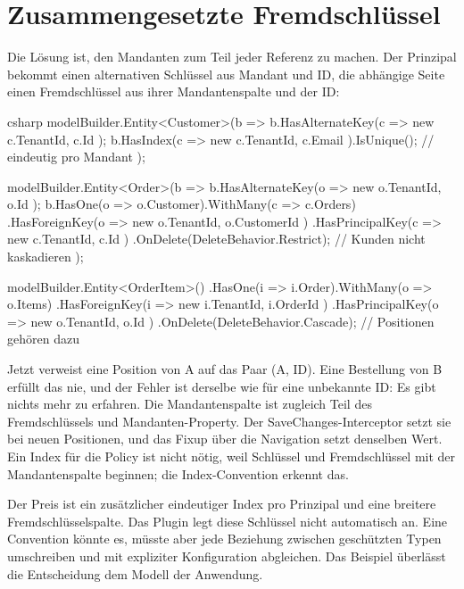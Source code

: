 \section{Zusammengesetzte Fremdschlüssel}

Die Lösung ist, den Mandanten zum Teil jeder Referenz zu machen. Der Prinzipal bekommt einen
alternativen Schlüssel aus Mandant und ID, die abhängige Seite einen Fremdschlüssel aus ihrer
Mandantenspalte und der ID:

\begin{sourcecode}{csharp}
modelBuilder.Entity<Customer>(b =>
{
    b.HasAlternateKey(c => new { c.TenantId, c.Id });
    b.HasIndex(c => new { c.TenantId, c.Email }).IsUnique();   // eindeutig pro Mandant
});

modelBuilder.Entity<Order>(b =>
{
    b.HasAlternateKey(o => new { o.TenantId, o.Id });
    b.HasOne(o => o.Customer).WithMany(c => c.Orders)
        .HasForeignKey(o => new { o.TenantId, o.CustomerId })
        .HasPrincipalKey(c => new { c.TenantId, c.Id })
        .OnDelete(DeleteBehavior.Restrict);                   // Kunden nicht kaskadieren
});

modelBuilder.Entity<OrderItem>()
    .HasOne(i => i.Order).WithMany(o => o.Items)
    .HasForeignKey(i => new { i.TenantId, i.OrderId })
    .HasPrincipalKey(o => new { o.TenantId, o.Id })
    .OnDelete(DeleteBehavior.Cascade);                         // Positionen gehören dazu
\end{sourcecode}

Jetzt verweist eine Position von A auf das Paar (A, ID). Eine Bestellung von B erfüllt das nie,
und der Fehler ist derselbe wie für eine unbekannte ID: Es gibt nichts mehr zu erfahren. Die
Mandantenspalte ist zugleich Teil des Fremdschlüssels und Mandanten-Property. Der
SaveChanges-Interceptor setzt sie bei neuen Positionen, und das Fixup über die Navigation setzt
denselben Wert. Ein Index für die Policy ist nicht nötig, weil Schlüssel und Fremdschlüssel mit
der Mandantenspalte beginnen; die Index-Convention erkennt das.

Der Preis ist ein zusätzlicher eindeutiger Index pro Prinzipal und eine breitere
Fremdschlüsselspalte. Das Plugin legt diese Schlüssel nicht automatisch an. Eine Convention
könnte es, müsste aber jede Beziehung zwischen geschützten Typen umschreiben und mit expliziter
Konfiguration abgleichen. Das Beispiel überlässt die Entscheidung dem Modell der Anwendung.


